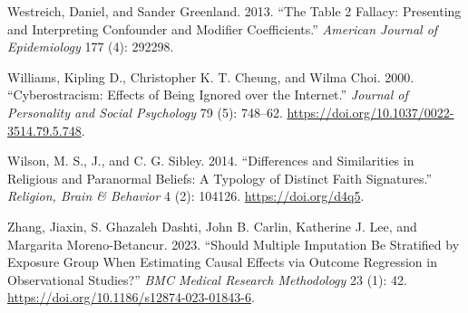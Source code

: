 \documentclass[
  singlecolumn]{report}
\newlength{\cslhangindent}
\newlength{\cslentryspacingunit} %
\newenvironment{CSLReferences}[2] %
 {%
  \setlength{\parindent}{0pt}
  \ifodd #1
  \let\oldpar\par
  \def\par{\hangindent=\cslhangindent\oldpar}
  \fi
  \setlength{\parskip}{#2\cslentryspacingunit}
 }%
 {}
\begin{document}
\begin{CSLReferences}{1}{0}
\leavevmode{}%
Westreich, Daniel, and Sander Greenland. 2013. {``The Table 2 Fallacy:
Presenting and Interpreting Confounder and Modifier Coefficients.''}
\emph{American Journal of Epidemiology} 177 (4): 292298.

\leavevmode{}%
Williams, Kipling D., Christopher K. T. Cheung, and Wilma Choi. 2000.
{``Cyberostracism: Effects of Being Ignored over the Internet.''}
\emph{Journal of Personality and Social Psychology} 79 (5): 748--62.
\url{https://doi.org/10.1037/0022-3514.79.5.748}.

\leavevmode{}%
Wilson, M. S., J., and C. G. Sibley. 2014. {``Differences and
Similarities in Religious and Paranormal Beliefs: A Typology of Distinct
Faith Signatures.''} \emph{Religion, Brain \& Behavior} 4 (2): 104126.
\url{https://doi.org/d4q5}.

\leavevmode{}%
Zhang, Jiaxin, S. Ghazaleh Dashti, John B. Carlin, Katherine J. Lee, and
Margarita Moreno-Betancur. 2023. {``Should Multiple Imputation Be
Stratified by Exposure Group When Estimating Causal Effects via Outcome
Regression in Observational Studies?''} \emph{BMC Medical Research
Methodology} 23 (1): 42.
\url{https://doi.org/10.1186/s12874-023-01843-6}.

\end{CSLReferences}
\end{document}
